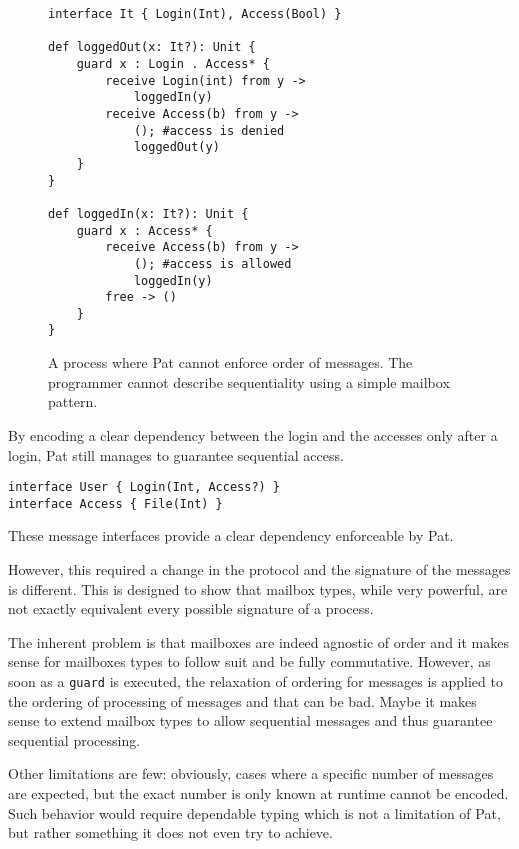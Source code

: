\begin{wrapfigure}{r}{0.5\textwidth}
\begin{lstlisting}
interface It { Login(Int), Access(Bool) }

def loggedOut(x: It?): Unit {
    guard x : Login . Access* {
        receive Login(int) from y ->
            loggedIn(y)
        receive Access(b) from y ->
            (); #access is denied
            loggedOut(y)
    }
}

def loggedIn(x: It?): Unit {
    guard x : Access* {
        receive Access(b) from y ->
            (); #access is allowed
            loggedIn(y)
        free -> ()
    }
}
\end{lstlisting}
\caption{A process where Pat cannot enforce order of messages. The programmer cannot describe sequentiality using a simple mailbox pattern.}
\label{lst:patCommutativity}
\end{wrapfigure}

By encoding a clear dependency between the login and the accesses only after a login, Pat still manages to guarantee sequential access.

\begin{lstlisting}
interface User { Login(Int, Access?) }
interface Access { File(Int) }
\end{lstlisting}
\vspace{0.4cm}

These message interfaces provide a clear dependency enforceable by Pat.

However, this required a change in the protocol and the signature of the messages is different. This is designed to show that mailbox types, while very powerful, are not exactly equivalent every possible signature of a process. 

The inherent problem is that mailboxes are indeed agnostic of order and it makes sense for mailboxes types to follow suit and be fully commutative. However, as soon as a \lstinline|guard| is executed, the relaxation of ordering for messages is applied to the ordering of processing of messages and that can be bad. Maybe it makes sense to extend mailbox types to allow sequential messages and thus guarantee sequential processing.

Other limitations are few: obviously, cases where a specific number of messages are expected, but the exact number is only known at runtime cannot be encoded. Such behavior would require dependable typing which is not a limitation of Pat, but rather something it does not even try to achieve.


